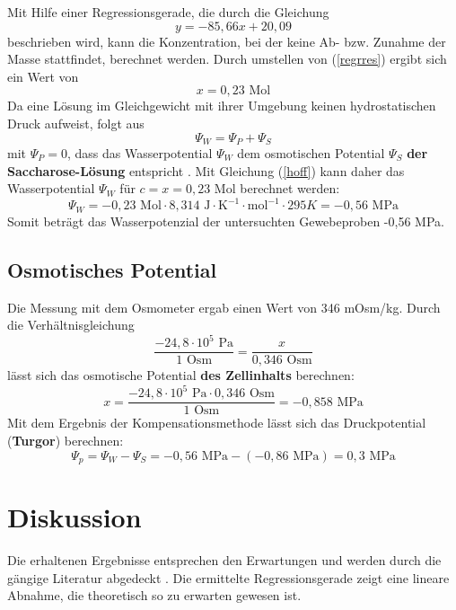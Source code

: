 \documentclass[11pt,a4paper,DIV=10,]{scrartcl}
\begin{document}
\noindent
Mit Hilfe einer Regressionsgerade, die durch die Gleichung
\begin{equation}
y= -85,66x+20,09 \label{regrres}
\end{equation}
beschrieben wird, kann die Konzentration, bei der keine Ab- bzw. Zunahme der Masse stattfindet, berechnet werden. Durch umstellen von (\ref{regrres}) ergibt sich ein Wert von
\begin{equation}
x=0,23 \textrm{~Mol}
\end{equation}
Da eine Lösung im Gleichgewicht mit ihrer Umgebung keinen hydrostatischen Druck aufweist, folgt aus
\begin{equation}
\Psi_W=\Psi_P+\Psi_S
\end{equation}
mit $\Psi_P=0$, dass das Wasserpotential $\Psi_W$ dem osmotischen Potential $\Psi_S$ \textbf{der Saccharo\-se-Lösung} entspricht \citep[vgl.][S. 261]{strasburger_lehrbuch_2012}.
Mit Gleichung (\ref{hoff})
kann daher das Wasserpotential $\Psi_W$ für $c=x=0,23 \textrm{~Mol}$ berechnet werden:
\begin{equation}
\Psi_W=-0,23 \textrm{~Mol} \cdot 8,314 \textrm{~J}\cdot\textrm{K}^{-1}\cdot \textrm{mol}^{-1}\cdot 295 K=-0,56 \textrm{~MPa}
 \end{equation}
Somit beträgt das Wasserpotenzial der untersuchten Gewebeproben -0,56 MPa.
\subsection*{Osmotisches Potential}
Die Messung mit dem Osmometer ergab einen Wert von 346 mOsm/kg. Durch die Verhältnisgleichung
\begin{equation}
\dfrac{-24,8 \cdot 10^5 \textrm{~Pa}}{1 \textrm{~Osm} } = \dfrac{x}{0,346 \textrm{~Osm}}
\end{equation}
lässt sich das osmotische Potential \textbf{des Zellinhalts} berechnen:
\begin{equation}
x = \dfrac{-24,8 \cdot 10^5 \textrm{~Pa} \cdot 0,346 \textrm{~Osm}}{1 \textrm{~Osm} } = -0,858 \textrm{~MPa}
\end{equation}
Mit dem Ergebnis der Kompensationsmethode lässt sich das Druckpotential (\textbf{Turgor}) berechnen:
\begin{equation}
\Psi_p=\Psi_W-\Psi_S=-0,56 \textrm{~MPa} - (-0,86 \textrm{~MPa})= 0,3 \textrm{~MPa}
\end{equation}
%
\section*{Diskussion}
Die erhaltenen Ergebnisse entsprechen den Erwartungen und werden durch die gängige Literatur abgedeckt \citep[vgl.][S. 54]{schopfer_pflanzenphysiologie_2010}. Die ermittelte Regressionsgerade zeigt eine lineare Abnahme, die theoretisch so zu erwarten gewesen ist. 
\end{document}
